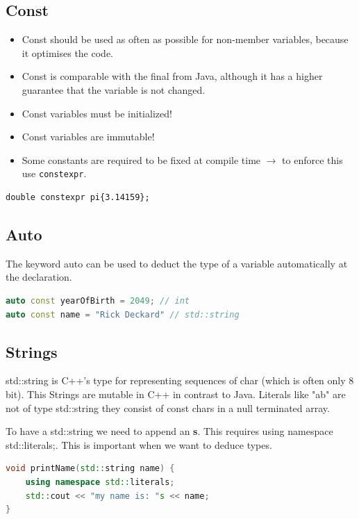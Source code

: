 \subsection{Const}
\begin{itemize}
  \itemsep -0.5em 
  \item Const should be used as often as possible for non-member variables, because it optimises the code.
  \item Const is comparable with the final from Java, although it has a higher guarantee that the variable is not changed.
  \item Const variables must be initialized!
  \item Const variables are immutable!
  \item Some constants are required to be fixed at compile time $\rightarrow$ to enforce this use \lstinline|constexpr|.
\end{itemize}

\begin{lstlisting}
double constexpr pi{3.14159};
\end{lstlisting}

\subsection{Auto}
The keyword auto can be used to deduct the type of a variable automatically at the declaration.
\begin{lstlisting}[language=C++]
auto const yearOfBirth = 2049; // int
auto const name = "Rick Deckard" // std::string
\end{lstlisting}

\subsection{Strings}
 std::string is C++'s type for representing sequences of char (which is often only 8 bit). This Strings are mutable in C++ in contrast to Java. Literals like "ab" are not of type std::string they consist of const chars in a null terminated array.
 
 To have a std::string we need to append an \textbf{s}. This requires using namespace std::literals;. This is important when we want to deduce types.
 
 \begin{lstlisting}[language=C++]
 void printName(std::string name) {
	using namespace std::literals;
	std::cout << "my name is: "s << name;
}	
\end{lstlisting}

